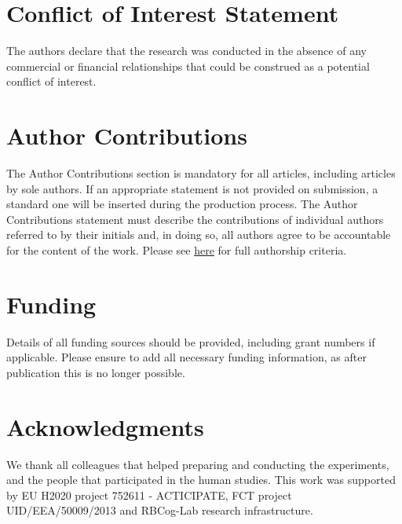 \documentclass[utf8]{frontiersSCNS} %
\begin{document}







\section*{Conflict of Interest Statement}

The authors declare that the research was conducted in the absence of any commercial or financial relationships that could be construed as a potential conflict of interest.

\section*{Author Contributions}

The Author Contributions section is mandatory for all articles, including articles by sole authors. If an appropriate statement is not provided on submission, a standard one will be inserted during the production process. The Author Contributions statement must describe the contributions of individual authors referred to by their initials and, in doing so, all authors agree to be accountable for the content of the work. Please see  \href{http://home.frontiersin.org/about/author-guidelines#AuthorandContributors}{here} for full authorship criteria.

\section*{Funding}
Details of all funding sources should be provided, including grant numbers if applicable. Please ensure to add all necessary funding information, as after publication this is no longer possible.

\section*{Acknowledgments}
We thank all colleagues that helped preparing and conducting the experiments, and the people that participated in the human studies. 
This work was supported by EU H2020 project 752611 - ACTICIPATE, FCT project UID/EEA/50009/2013 and RBCog-Lab research infrastructure.
\end{document}
